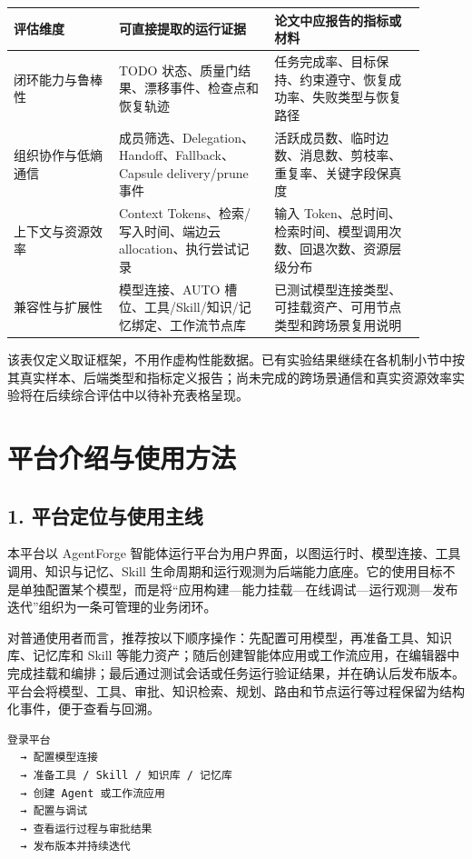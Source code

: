 \documentclass[UTF8,a4paper,12pt]{ctexart}
\begin{document}
\begin{longtable}{p{0.23\linewidth}p{0.34\linewidth}p{0.33\linewidth}}
\toprule
评估维度 & 可直接提取的运行证据 & 论文中应报告的指标或材料 \\
\midrule
闭环能力与鲁棒性 & TODO 状态、质量门结果、漂移事件、检查点和恢复轨迹 & 任务完成率、目标保持、约束遵守、恢复成功率、失败类型与恢复路径 \\
组织协作与低熵通信 & 成员筛选、Delegation、Handoff、Fallback、Capsule delivery/prune 事件 & 活跃成员数、临时边数、消息数、剪枝率、重复率、关键字段保真度 \\
上下文与资源效率 & Context Tokens、检索/写入时间、端边云 allocation、执行尝试记录 & 输入 Token、总时间、检索时间、模型调用次数、回退次数、资源层级分布 \\
兼容性与扩展性 & 模型连接、AUTO 槽位、工具/Skill/知识/记忆绑定、工作流节点库 & 已测试模型连接类型、可挂载资产、可用节点类型和跨场景复用说明 \\
\bottomrule
\end{longtable}

该表仅定义取证框架，不用作虚构性能数据。已有实验结果继续在各机制小节中按其真实样本、后端类型和指标定义报告；尚未完成的跨场景通信和真实资源效率实验将在后续综合评估中以待补充表格呈现。

\section{平台介绍与使用方法}

\subsection{1. 平台定位与使用主线}

本平台以 AgentForge 智能体运行平台为用户界面，以图运行时、模型连接、工具调用、知识与记忆、Skill 生命周期和运行观测为后端能力底座。它的使用目标不是单独配置某个模型，而是将``应用构建—能力挂载—在线调试—运行观测—发布迭代''组织为一条可管理的业务闭环。

对普通使用者而言，推荐按以下顺序操作：先配置可用模型，再准备工具、知识库、记忆库和 Skill 等能力资产；随后创建智能体应用或工作流应用，在编辑器中完成挂载和编排；最后通过测试会话或任务运行验证结果，并在确认后发布版本。平台会将模型、工具、审批、知识检索、规划、路由和节点运行等过程保留为结构化事件，便于查看与回溯。

\begin{verbatim}
登录平台
  → 配置模型连接
  → 准备工具 / Skill / 知识库 / 记忆库
  → 创建 Agent 或工作流应用
  → 配置与调试
  → 查看运行过程与审批结果
  → 发布版本并持续迭代
\end{verbatim}
\end{document}
